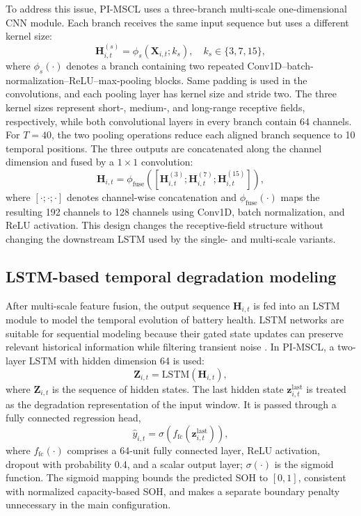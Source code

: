 \documentclass[a4paper,fleqn]{cas-dc}
\begin{document}
To address this issue, PI-MSCL uses a three-branch multi-scale one-dimensional CNN module. Each branch receives the same input sequence but uses a different kernel size:
\begin{equation}
\mathbf{H}^{(s)}_{i,t}=\phi_{s}\left(\mathbf{X}_{i,t};k_s\right),
\quad k_s\in\{3,7,15\},
\label{eq:multiscale_branch}
\end{equation}
where $\phi_s(\cdot)$ denotes a branch containing two repeated Conv1D--batch-normalization--ReLU--max-pooling blocks. Same padding is used in the convolutions, and each pooling layer has kernel size and stride two. The three kernel sizes represent short-, medium-, and long-range receptive fields, respectively, while both convolutional layers in every branch contain 64 channels. For $T=40$, the two pooling operations reduce each aligned branch sequence to 10 temporal positions. The three outputs are concatenated along the channel dimension and fused by a $1\times1$ convolution:
\begin{equation}
\mathbf{H}_{i,t}=\phi_{\mathrm{fuse}}\left(
\left[\mathbf{H}^{(3)}_{i,t};\mathbf{H}^{(7)}_{i,t};\mathbf{H}^{(15)}_{i,t}\right]
\right),
\label{eq:multiscale_fusion}
\end{equation}
where $[\cdot;\cdot;\cdot]$ denotes channel-wise concatenation and $\phi_{\mathrm{fuse}}(\cdot)$ maps the resulting 192 channels to 128 channels using Conv1D, batch normalization, and ReLU activation. This design changes the receptive-field structure without changing the downstream LSTM used by the single- and multi-scale variants.

\subsection{LSTM-based temporal degradation modeling}
\label{subsec:lstm}

After multi-scale feature fusion, the output sequence $\mathbf{H}_{i,t}$ is fed into an LSTM module to model the temporal evolution of battery health. LSTM networks are suitable for sequential modeling because their gated state updates can preserve relevant historical information while filtering transient noise \cite{hochreiter1997long}. In PI-MSCL, a two-layer LSTM with hidden dimension 64 is used:
\begin{equation}
\mathbf{Z}_{i,t}=\mathrm{LSTM}\left(\mathbf{H}_{i,t}\right),
\label{eq:lstm_sequence}
\end{equation}
where $\mathbf{Z}_{i,t}$ is the sequence of hidden states. The last hidden state $\mathbf{z}_{i,t}^{\mathrm{last}}$ is treated as the degradation representation of the input window. It is passed through a fully connected regression head,
\begin{equation}
\hat{y}_{i,t}=\sigma\left(f_{\mathrm{fc}}\left(\mathbf{z}_{i,t}^{\mathrm{last}}\right)\right),
\label{eq:soh_regression}
\end{equation}
where $f_{\mathrm{fc}}(\cdot)$ comprises a 64-unit fully connected layer, ReLU activation, dropout with probability 0.4, and a scalar output layer; $\sigma(\cdot)$ is the sigmoid function. The sigmoid mapping bounds the predicted SOH to $[0,1]$, consistent with normalized capacity-based SOH, and makes a separate boundary penalty unnecessary in the main configuration.
\end{document}
